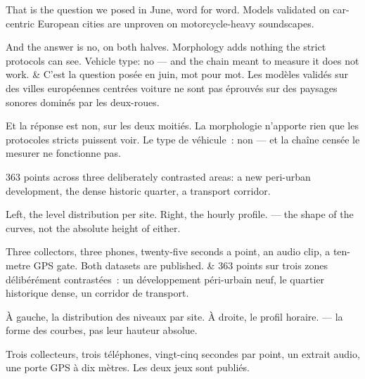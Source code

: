 \documentclass[10pt,a4paper]{article}
\begin{document}
\begin{say}
 That is the question we posed in June, word for
word. Models validated on car-centric European cities are unproven on
motorcycle-heavy soundscapes.


And the answer is no, on both halves. Morphology adds nothing the strict
protocols can see. Vehicle type: no --- and the chain meant to measure it does not
work.
&
 C'est la question posée en juin, mot pour mot. Les
modèles validés sur des villes européennes centrées voiture ne sont pas éprouvés
sur des paysages sonores dominés par les deux-roues.


Et la réponse est non, sur les deux moitiés. La morphologie n'apporte rien que
les protocoles stricts puissent voir. Le type de véhicule~: non --- et la chaîne
censée le mesurer ne fonctionne pas.
\end{say}

\begin{say}
363 points across three deliberately contrasted areas: a new peri-urban
development, the dense historic quarter, a transport corridor.

Left, the level distribution per site. Right, the hourly profile.  --- the shape of the curves, not the
absolute height of either.

Three collectors, three phones, twenty-five seconds a point, an audio clip, a
ten-metre GPS gate. Both datasets are published.
&
363 points sur trois zones délibérément contrastées~: un développement
péri-urbain neuf, le quartier historique dense, un corridor de transport.

À gauche, la distribution des niveaux par site. À droite, le profil horaire.
 --- la forme des
courbes, pas leur hauteur absolue.

Trois collecteurs, trois téléphones, vingt-cinq secondes par point, un extrait
audio, une porte GPS à dix mètres. Les deux jeux sont publiés.
\end{say}
\end{document}
